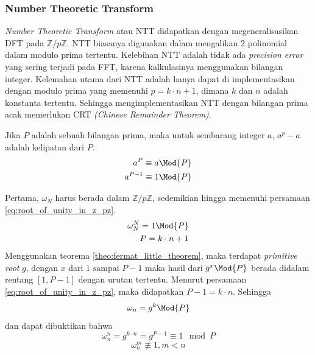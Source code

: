 \subsubsection{Number Theoretic Transform} \label{ssec:ntt}
\textit{Number Theoretic Transform} atau NTT didapatkan dengan megeneralisasikan DFT pada $ \mathbb{Z}/p\mathbb{Z} $. NTT biasanya digunakan dalam mengalikan 2 polinomial dalam modulo prima tertentu. Kelebihan NTT adalah tidak ada \textit{precision error} yang sering terjadi pada FFT, karena kalkulasinya menggunakan bilangan integer. Kelemahan utama dari NTT adalah hanya dapat di implementasikan dengan modulo prima yang memenuhi $ p = k \cdot n + 1 $, dimana $ k $ dan $ n $ adalah konstanta tertentu. Sehingga mengimplementasikan NTT dengan bilangan prima acak memerlukan CRT \textit{(Chinese Remainder Theorem)}.

\begin{theo}
	\label{theo:fermat_little_theorem}
	Jika $ P $ adalah sebuah bilangan prima, maka untuk sembarang integer $ a $, $ a^p - a $ adalah kelipatan dari $ P $.
	\begin{equation}
		\begin{aligned}
			a^{P} \equiv a \Mod{P} \\
			a^{P-1} \equiv 1 \Mod{P} \\
		\end{aligned}
		\label{eq:fermat_theorem}
	\end{equation}
\end{theo}

Pertama, $ \omega_N $ harus berada dalam $ \mathbb{Z}/p\mathbb{Z} $, sedemikian hingga memenuhi persamaan \eqref{eq:root_of_unity_in_z_pz}.
\begin{equation}
	\begin{aligned}
		\omega_N^N = 1 \Mod{P} \\
		P = k \cdot n + 1 \\
	\end{aligned}
	\label{eq:root_of_unity_in_z_pz}
\end{equation}
Menggunakan teorema \ref{theo:fermat_little_theorem}, maka terdapat \textit{primitive root} $ g $, dengan $ x $ dari $ 1 \text{ sampai } P-1 $ maka hasil dari $ g^x \Mod{P} $ berada didalam rentang $ [1,P-1] $ dengan urutan tertentu. Menurut persamaan \eqref{eq:root_of_unity_in_z_pz}, maka didapatkan $ P-1 = k \cdot n $\cite{ntt}. Sehingga 
$$ \omega_n = g^{k} \Mod{P} $$
dan dapat dibuktikan bahwa
$$ \omega_n^n = g^{k \cdot n} = g^{P-1} \equiv 1 \mod{P} $$
$$ \omega_n^m \not\equiv 1 , m < n $$

